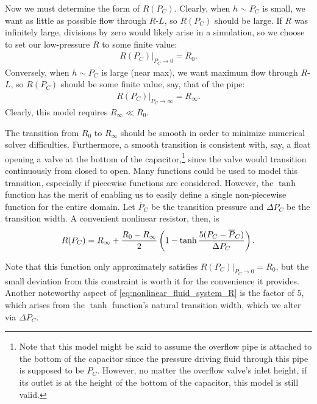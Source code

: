 \documentclass[dynamic_systems.tex]{subfiles}
\begin{document}
Now we must determine the form of $R(P_C)$.
Clearly, when $h \sim P_C$ is small, we want as little as possible flow through $R$-$L$, so $R(P_C)$ should be large.
If $R$ was infinitely large, divisions by zero would likely arise in a simulation, so we choose to set our low-pressure $R$ to some finite value:
\begin{align}
  R(P_C)|_{P_C\rightarrow 0} = R_0.
\end{align}
Conversely, when $h \sim P_C$ is large (near max), we want maximum flow through $R$-$L$, so $R(P_C)$ should be some finite value, say, that of the pipe:
\begin{align}
  R(P_C)|_{P_C\rightarrow\infty} = R_\infty.
\end{align}
Clearly, this model requires $R_\infty \ll R_0$.

The transition from $R_0$ to $R_\infty$ should be smooth in order to minimize numerical solver difficulties.
Furthermore, a smooth transition is consistent with, say, a float opening a valve at the bottom of the capacitor,\footnote{Note that this model might be said to assume the overflow pipe is attached to the bottom of the capacitor since the pressure driving fluid through this pipe is supposed to be $P_C$. However, no matter the overflow valve's inlet height, if its outlet is at the height of the bottom of the capacitor, this model is still valid.}
since the valve would transition continuously from closed to open.
Many functions could be used to model this transition, especially if piecewise functions are considered.
However, the $\tanh$ function has the merit of enabling us to easily define a single non-piecewise function for the entire domain.
Let $\overline{P}_C$ be the transition pressure and $\Delta P_C$ be the transition width.
A convenient nonlinear resistor, then, is
\begin{align}\label{eq:nonlinear_fluid_system_R}
  R(P_C) = 
  R_\infty +
  \frac{R_0-R_\infty}{2}
  \left(
    1-
    \tanh{%
      \frac{5(P_C - \overline{P}_C)}{\Delta P_C}
    }
  \right).
\end{align}

Note that this function only approximately satisfies $R(P_C)|_{P_C\rightarrow 0} = R_0$, but the small deviation from this constraint is worth it for the convenience it provides.
Another noteworthy aspect of \autoref{eq:nonlinear_fluid_system_R} is the factor of $5$, which arises from the $\tanh$ function's natural transition width, which we alter via $\Delta P_C$.
\tags{}
\end{document}
